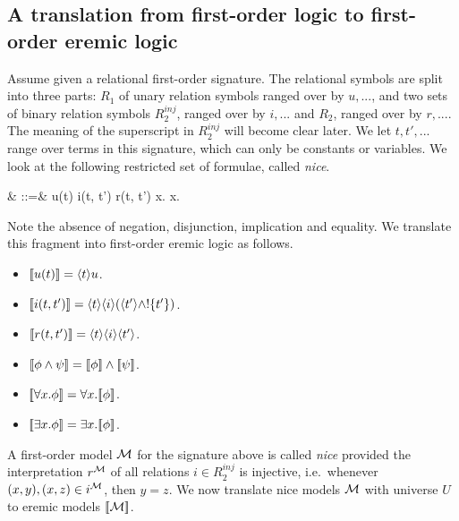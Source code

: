 \subsection{A translation from first-order logic to first-order eremic logic}


Assume given a relational first-order signature. The relational
symbols are split into three parts: $R_1$ of unary relation symbols
ranged over by $u, ...$, and two sets of binary relation symbols
$R_2^{inj}$, ranged over by $i, ...$ and $R_2$, ranged over by $r,
...$. The meaning of the superscript in $R_2^{inj}$ will become clear
later.  We let $t, t', ...$ range over terms in this signature, which
can only be constants or variables. We look at the following
restricted set of formulae, called \emph{nice}.
\begin{GRAMMAR}
  \phi
     & \quad::=\quad &
  u(t) 
     \VERTICAL 
  i(t, t') 
     \VERTICAL 
  r(t, t') 
     \VERTICAL 
  \phi \AND \psi 
     \VERTICAL 
  \forall x.\phi 
     \VERTICAL 
  \exists x.\phi
\end{GRAMMAR}

\NI Note the absence of negation, disjunction, implication and
equality. We translate this fragment into first-order eremic logic as
follows.
\begin{itemize}

\item $\lbrack\!\lbrack u(t) \rbrack\!\rbrack = \langle t \rangle u$.

\item $\lbrack\!\lbrack i(t, t') \rbrack\!\rbrack = \langle t \rangle \langle i \rangle (\langle t' \rangle \land !\{t'\})$.

\item $\lbrack\!\lbrack r(t, t') \rbrack\!\rbrack = \langle t \rangle \langle i \rangle \langle t' \rangle$.

\item $\lbrack\!\lbrack \phi \land \psi \rbrack\!\rbrack = \lbrack\!\lbrack \phi \rbrack\!\rbrack \land \lbrack\!\lbrack \psi \rbrack\!\rbrack$.

\item $\lbrack\!\lbrack \forall x.\phi \rbrack\!\rbrack = \forall x.\lbrack\!\lbrack \phi \rbrack\!\rbrack$.

\item $\lbrack\!\lbrack \exists x.\phi \rbrack\!\rbrack = \exists x.\lbrack\!\lbrack \phi \rbrack\!\rbrack$.

\end{itemize}

\NI A first-order model $\mathcal{M}$ for the signature above is called
\emph{nice} provided the interpretation $r^{\mathcal{M}}$ of all relations
$i \in R_2^{inj}$ is injective, i.e.~whenever $(x, y), (x, z) \in
i^{\mathcal{M}}$, then $y = z$. We now translate nice models $\mathcal{M}$
with universe $U$ to eremic models $\lbrack\!\lbrack \mathcal{M} \rbrack\!\rbrack$.


